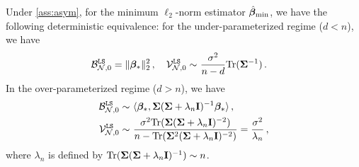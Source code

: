 \begin{corollary}\label{prop:asy_equiv_norm_LR_minnorm}
    Under \cref{ass:asym}, for the minimum $\ell_2$-norm estimator $\hat{{\boldsymbol \beta}}_{\min}$, we have the following deterministic equivalence: for the under-parameterized regime ($d<n$), we have
    \[
    \begin{aligned}
        \mathcal{B}^{\tt LS}_{\mathcal{N},0} = \|{\boldsymbol \beta}_*\|_2^2\,,\quad \mathcal{V}^{\tt LS}_{\mathcal{N},0} \sim&~ \frac{\sigma^2}{n-d}{\rm Tr}({\boldsymbol \Sigma}^{-1})\,.
    \end{aligned}
    \]
    In the over-parameterized regime ($d>n$), we have
    \[
    \begin{aligned}
        \mathcal{B}^{\tt LS}_{\mathcal{N},0} \sim&~ \langle{\boldsymbol \beta}_*,{\boldsymbol \Sigma}({\boldsymbol \Sigma}+\lambda_n{\mathbf I})^{-1}{\boldsymbol \beta}_*\rangle\,,\\
        \mathcal{V}^{\tt LS}_{\mathcal{N},0} \sim&~ \frac{\sigma^2{\rm Tr}({\boldsymbol \Sigma}({\boldsymbol \Sigma}+\lambda_n{\mathbf I})^{-2})}{n-{\rm Tr}({\boldsymbol \Sigma}^2({\boldsymbol \Sigma}+\lambda_n{\mathbf I})^{-2})} = \frac{\sigma^2}{\lambda_n}\,,
    \end{aligned}
    \]
    where $\lambda_n$ is defined by ${\rm Tr}({\boldsymbol \Sigma}({\boldsymbol \Sigma}+\lambda_n{\mathbf I})^{-1}) \sim n$.
\end{corollary}
